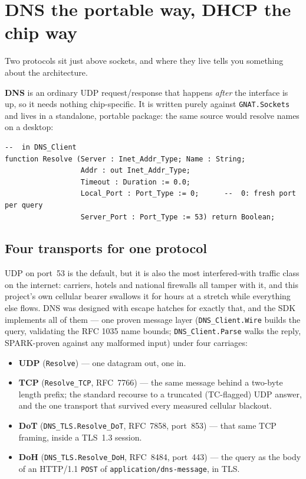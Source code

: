 \section{DNS the portable way, DHCP the chip way}
\label{ch:net:dns-dhcp}

Two protocols sit just above sockets, and where they live tells you something about
the architecture.

\textbf{DNS} is an ordinary UDP request/response that happens \emph{after} the
interface is up, so it needs nothing chip-specific. It is written purely against
\texttt{GNAT.Sockets} and lives in a standalone, portable package: the same
source would resolve names on a desktop:

\begin{lstlisting}
--  in DNS_Client
function Resolve (Server : Inet_Addr_Type; Name : String;
                  Addr : out Inet_Addr_Type;
                  Timeout : Duration := 0.0;
                  Local_Port : Port_Type := 0;      --  0: fresh port per query
                  Server_Port : Port_Type := 53) return Boolean;
\end{lstlisting}

\subsection{Four transports for one protocol}

UDP on port~53 is the default, but it is also the most interfered-with
traffic class on the internet: carriers, hotels and national firewalls all
tamper with it, and this project's own cellular bearer swallows it for hours
at a stretch while everything else flows. DNS was designed with escape
hatches for exactly that, and the SDK implements all of them --- one proven
message layer (\texttt{DNS\_Client.Wire} builds the query, validating the RFC
1035 name bounds; \texttt{DNS\_Client.Parse} walks the reply, SPARK-proven
against any malformed input) under four carriages:

\begin{itemize}
\item \textbf{UDP} (\texttt{Resolve}) --- one datagram out, one in.
\item \textbf{TCP} (\texttt{Resolve\_TCP}, RFC~7766) --- the same message
  behind a two-byte length prefix; the standard recourse to a truncated
  (TC-flagged) UDP answer, and the one transport that survived every measured
  cellular blackout.
\item \textbf{DoT} (\texttt{DNS\_TLS.Resolve\_DoT}, RFC~7858, port~853) ---
  that same TCP framing, inside a TLS~1.3 session.
\item \textbf{DoH} (\texttt{DNS\_TLS.Resolve\_DoH}, RFC~8484, port~443) ---
  the query as the body of an HTTP/1.1 \texttt{POST} of
  \texttt{application/dns-message}, in TLS.
\end{itemize}

